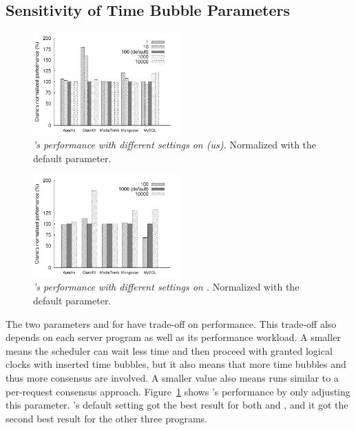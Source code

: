\subsection{Sensitivity of Time Bubble Parameters} \label{sec:sensitivity}
\begin{figure}[t]
\centering
\includegraphics[width=0.5\textwidth]{figures/usleep-sensitivity}
\vspace{-.30in}
\caption{\small {\em \xxx's performance with different settings on \ntimeout 
(us).} Normalized with the default parameter.}
\label{fig:usleep-sensitivity}
\end{figure}

\begin{figure}[t]
\centering
\includegraphics[width=0.5\textwidth]{figures/nclock-sensitivity}
\vspace{-.30in}
\caption{\small {\em \xxx's performance with different settings on \nclock.} 
Normalized with the default parameter.}
\label{fig:nclock-sensitivity}
\end{figure}

The two parameters \ntimeout and \nclock for \timealgo have trade-off on 
performance. This trade-off also depends on each server program as well as its 
performance workload. A smaller \ntimeout means the \dmt 
scheduler can wait less time and then proceed with granted logical clocks with 
inserted time bubbles, but it also means that more time bubbles and thus more 
\paxos consensus are involved. A smaller value also means \timealgo runs 
similar to a per-request consensus approach. 
Figure~\ref{fig:usleep-sensitivity} shows \xxx's performance by only adjusting 
this parameter. \xxx's default setting got the best result for both \apache 
and \clamav, and it got the second best result for the other three programs. 

